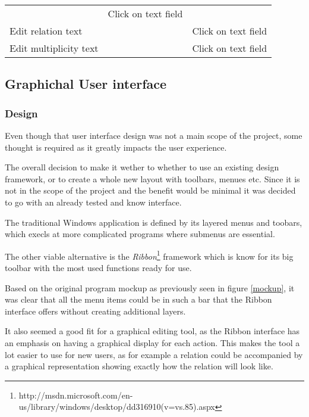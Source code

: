 \begin{table}[h]
\begin{tabular}{lll}
		                     &
		 Click on text 
		field                                                                 \\
		Edit relation text         
		&                                                                       
		                     &
		 Click on text 
		field                                                                 \\
		Edit multiplicity text     
		&                                                                       
		                     &
		 Click on text 
		field                                                                 \\
		 \hline
	\end{tabular}
\end{table}



\subsection{Graphichal User interface}

\subsubsection{Design}

Even though that
user interface design was not a main scope of the project, some thought is
required as it greatly impacts the user experience. 

The overall decision to make it wether to whether to use an existing design
framework, or to create a whole new layout with toolbars, menues etc. Since it
is not in the scope of the project and the benefit would be minimal it was
decided to go with an already tested and know interface. 

The traditional Windows application is defined by its layered menus and toobars,
which execls at more complicated programs where submenus are essential.

The other viable alternative is the
\textit{Ribbon}\footnote{http://msdn.microsoft.com/en-us/library/windows/desktop/dd316910(v=vs.85).aspx}
framework which is know for its big toolbar with the most used functions ready
for use.

Based on the original program mockup as previously seen in figure \ref{mockup},
it was clear that all the menu items could be in such a bar that the Ribbon
interface offers without creating additional layers.

It also seemed a good fit for a graphical editing tool, as the Ribbon interface
has an emphasis on having a graphical display for each action. This makes the
tool a lot easier to use for new users, as for example a relation could be
accompanied by a graphical representation showing exactly how the relation will
look like.

